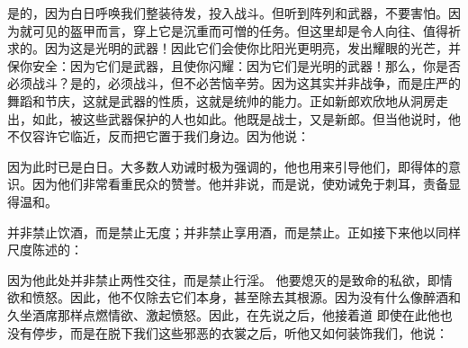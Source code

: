 \par

是的，因为白日呼唤我们整装待发，投入战斗。但听到阵列和武器，不要害怕。因为就可见的盔甲而言，穿上它是沉重而可憎的任务。但这里却是令人向往、值得祈求的。因为这是光明的武器！因此它们会使你比阳光更明亮，发出耀眼的光芒，并保你安全：因为它们是武器，且使你闪耀：因为它们是光明的武器！那么，你是否必须战斗？是的，必须战斗，但不必苦恼辛劳。因为这其实并非战争，而是庄严的舞蹈和节庆，这就是武器的性质，这就是统帅的能力。正如新郎欢欣地从洞房走出，如此，被这些武器保护的人也如此。他既是战士，又是新郎。但当他说时，他不仅容许它临近，反而把它置于我们身边。因为他说：\par

 因为此时已是白日。大多数人劝诫时极为强调的，他也用来引导他们，即得体的意识。因为他们非常看重民众的赞誉。他并非说，而是说，使劝诫免于刺耳，责备显得温和。\par

 并非禁止饮酒，而是禁止无度；并非禁止享用酒，而是禁止。正如接下来他以同样尺度陈述的：\par

 因为他此处并非禁止两性交往，而是禁止行淫。 他要熄灭的是致命的私欲，即情欲和愤怒。因此，他不仅除去它们本身，甚至除去其根源。因为没有什么像醉酒和久坐酒席那样点燃情欲、激起愤怒。因此，在先说之后，他接着道 即使在此他也没有停步，而是在脱下我们这些邪恶的衣裳之后，听他又如何装饰我们，他说：\par

 \par

